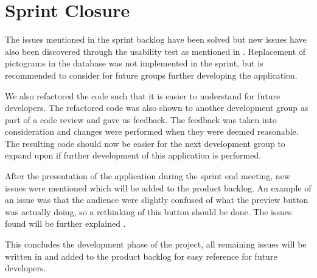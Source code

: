 \section{Sprint Closure}
The issues mentioned in the sprint backlog have been solved but new issues have also been discovered through the usability test as mentioned in .
Replacement of pictograms in the database was not implemented in the sprint, but is recommended to consider for future groups further developing the application.

We also refactored the code such that it is easier to understand for future developers.
The refactored code was also shown to another development group as part of a code review and gave us feedback.
The feedback was taken into consideration and changes were performed when they were deemed reasonable.
The resulting code should now be easier for the next development group to expand upon if further development of this application is performed.

After the presentation of the application during the sprint end meeting, new issues were mentioned which will be added to the product backlog.
An example of an issue was that the audience were slightly confused of what the preview button was actually doing, so a rethinking of this button should be done.
The issues found will be further explained .

This concludes the development phase of the project, all remaining issues will be written in  and added to the product backlog for easy reference for future developers.